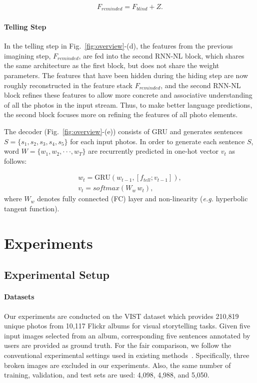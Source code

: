 \documentclass[letterpaper]{article} \usepackage{aaai20}  \usepackage{times}  \usepackage{helvet} \usepackage{courier}  \usepackage[hyphens]{url}  \usepackage{graphicx} \urlstyle{rm} \def\UrlFont{\rm}  \usepackage{graphicx}  \frenchspacing  \setlength{\pdfpagewidth}{8.5in}  \setlength{\pdfpageheight}{11in}
\newcommand{\figref}[1]{Fig.~\ref{#1}}
\newcommand{\eg}{{\it e.g. }}
\begin{document}
\begin{eqnarray}
F_{reminded} = F_{blind} + Z.
\label{equ:remind}
\end{eqnarray}


\paragraph{Telling Step}
\quad

\noindent
In the telling step in \figref{fig:overview}-(d), the features from the previous imagining step, $F_{reminded}$, are fed into the second RNN-NL block, which shares the same architecture as the first block, but does not share the weight parameters. The features that have been hidden during the hiding step are now roughly reconstructed in the feature stack $F_{reminded}$, and the second RNN-NL block refines these features to allow more concrete and associative understanding of all the photos in the input stream. Thus, to make better language predictions, the second block focuses more on refining the features of all photo elements.



The decoder (\figref{fig:overview}-(e)) consists of GRU and generates sentences $ S = \{s_{1}, s_{2}, s_{3}, s_{4}, s_{5}\} $ for each input photos. In order to generate each sentence $S$, word $ W = \{w_{1}, w_{2}, \cdot\cdot\cdot , w_{T}\} $ are recurrently predicted in one-hot vector $v_{t}$ as follows:

\begin{eqnarray}
w_{t} = \text{GRU}(w_{t-1},[f_{tell} ; v_{t-1}] ), \\
v_{t} = softmax(W_{w} \, w_{t}),
\label{equ:decoder}
\end{eqnarray}
where $W_{w}$ denotes fully connected (FC) layer and non-linearity (\eg hyperbolic tangent function).


\section{Experiments}

\subsection{Experimental Setup}
\paragraph{Datasets}
\quad

\noindent
Our experiments are conducted on the VIST dataset which provides 210,819 unique photos from 10,117 Flickr albums for visual storytelling tasks. Given five input images selected from an album, corresponding five sentences annotated by users are provided as ground truth. For the fair comparison, we follow the conventional experimental settings used in existing methods~\cite{yu2017hierarchically,wang2018no}. Specifically, three broken images are excluded in our experiments. Also, the same number of training, validation, and test sets are used: 4,098, 4,988, and 5,050.
\end{document}
